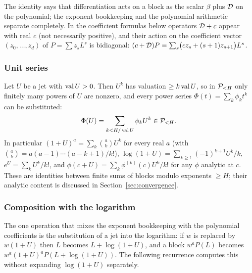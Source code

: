 The identity says that differentiation acts on a block as the scalar $\beta$ plus $\mathcal D$ on the polynomial; the exponent bookkeeping and the polynomial arithmetic separate completely. In the coefficient formulas below operators $\mathcal D+c$ appear with real $c$ (not necessarily positive), and their action on the coefficient vector $(z_0,\dots,z_d)$ of $P=\sum z_sL^s$ is bidiagonal: $(c+\mathcal D)P=\sum_s\bigl(cz_s+(s+1)z_{s+1}\bigr)L^s$.

\subsubsection*{Unit series}

Let $U$ be a jet with $\operatorname{val} U>0$. Then $U^k$ has valuation $\ge k\operatorname{val} U$, so in $\mathcal P_{<H}$ only finitely many powers of $U$ are nonzero, and every power series $\Phi(t)=\sum_k\phi_kt^k$ can be substituted:
\begin{equation}
 \Phi(U)=\sum_{k<H/\operatorname{val} U}\phi_kU^k\in\mathcal P_{<H}.
 \label{eq:unit-series}
\end{equation}
In particular $(1+U)^a=\sum_k\binom akU^k$ for every real $a$ (with $\binom ak=a(a-1)\cdots(a-k+1)/k!$), $\log(1+U)=\sum_{k\ge1}(-1)^{k+1}U^k/k$, $e^U=\sum_kU^k/k!$, and $\phi(c+U)=\sum_k\phi^{(k)}(c)U^k/k!$ for any $\phi$ analytic at $c$. These are identities between finite sums of blocks modulo exponents $\ge H$; their analytic content is discussed in Section~\ref{sec:convergence}.

\subsubsection*{Composition with the logarithm}

The one operation that mixes the exponent bookkeeping with the polynomial coefficients is the substitution of a jet into the logarithm: if $w$ is replaced by $w(1+U)$ then $L$ becomes $L+\log(1+U)$, and a block $w^a P(L)$ becomes $w^a(1+U)^aP(L+\log(1+U))$. The following recurrence computes this without expanding $\log(1+U)$ separately.

